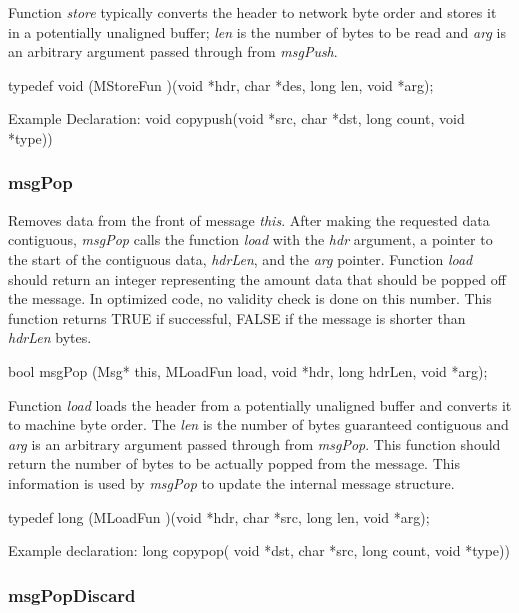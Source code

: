 Function {\em store} typically converts the header to network byte
order and stores it in a potentially unaligned buffer; {\em len} is
the number of bytes to be read and {\em arg} is an arbitrary argument
passed through from {\em msgPush}.
\medskip

{\sem typedef void} ({\bold *MStoreFun} )({\sem void} *{\caps hdr}, {\sem char} *{\caps des}, {\sem long} {\caps len}, {\sem void} *{\caps arg});
\medskip

{\sanss Example Declaration: }{\sem void} {\bold copypush}({\sem void}
*{\caps src}, {\sem char} *{\caps dst}, {\sem long} {\caps  count}, {\sem void} *{\caps type}))

\subsubsection{msgPop}

Removes data from the front of message {\em this}.  After making the
requested data contiguous, {\em msgPop} calls the function {\em load}
with the {\em hdr} argument, a pointer to the start of the contiguous
data, {\em hdrLen}, and the {\em arg} pointer.  Function {\em load}
should return an integer representing the amount data that should be
popped off the message.  In optimized code, no validity check is done
on this number. This function returns TRUE if successful, FALSE if the
message is shorter than {\em hdrLen} bytes.
\medskip

{\sem bool}  {\bold msgPop} ({\sem Msg*} {\caps this}, {\sem MLoadFun} {\caps load}, {\sem void} *{\caps hdr}, {\sem long} {\caps hdrLen}, {\sem void} *{\caps arg});
\medskip

Function {\em load} loads the header from a potentially unaligned
buffer and converts it to machine byte order.  The {\em len} is the
number of bytes guaranteed contiguous and {\em arg} is an arbitrary
argument passed through from {\em msgPop}.  This function should
return the number of bytes to be actually popped from the message.
This information is used by {\em msgPop} to update the internal
message structure.
\medskip

{\sem typedef long} ({\bold *MLoadFun} )({\sem void} *{\caps hdr}, {\sem char} *{\caps src}, {\sem long} {\caps len}, {\sem void} *{\caps arg});
\medskip

{\sanss Example declaration: }{\sem long} {\bold copypop}(
{\sem void} *{\caps dst}, 
{\sem char} *{\caps src}, 
{\sem long} {\caps  count}, 
{\sem void} *{\caps type}))

\subsubsection{msgPopDiscard}

